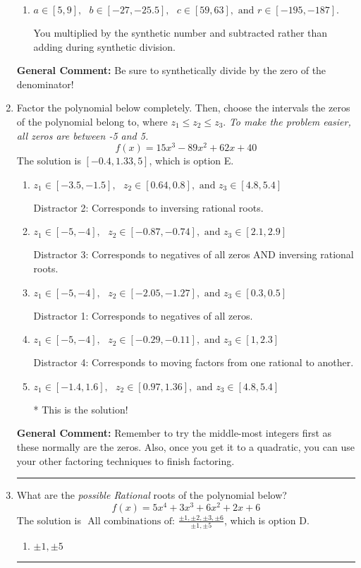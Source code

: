 \documentclass{extbook}[14pt]
\newcommand{\litem}[1]{\item #1

\rule{\textwidth}{0.4pt}}
\begin{document}
\begin{enumerate}
{\begin{enumerate}[label=\Alph*.]
 You divided by the opposite of the factor.
\item \( a \in [5, 9], \text{   } b \in [-27, -25.5], \text{   } c \in [59, 63], \text{   and   } r \in [-195, -187]. \)

 You multiplied by the synthetic number and subtracted rather than adding during synthetic division.
\end{enumerate}

\textbf{General Comment:} Be sure to synthetically divide by the zero of the denominator!
}
\litem{
Factor the polynomial below completely. Then, choose the intervals the zeros of the polynomial belong to, where $z_1 \leq z_2 \leq z_3$. \textit{To make the problem easier, all zeros are between -5 and 5.}
\[ f(x) = 15x^{3} -89 x^{2} +62 x + 40 \]The solution is \( [-0.4, 1.33, 5] \), which is option E.\begin{enumerate}[label=\Alph*.]
\item \( z_1 \in [-3.5, -1.5], \text{   }  z_2 \in [0.64, 0.8], \text{   and   } z_3 \in [4.8, 5.4] \)

 Distractor 2: Corresponds to inversing rational roots.
\item \( z_1 \in [-5, -4], \text{   }  z_2 \in [-0.87, -0.74], \text{   and   } z_3 \in [2.1, 2.9] \)

 Distractor 3: Corresponds to negatives of all zeros AND inversing rational roots.
\item \( z_1 \in [-5, -4], \text{   }  z_2 \in [-2.05, -1.27], \text{   and   } z_3 \in [0.3, 0.5] \)

 Distractor 1: Corresponds to negatives of all zeros.
\item \( z_1 \in [-5, -4], \text{   }  z_2 \in [-0.29, -0.11], \text{   and   } z_3 \in [1, 2.3] \)

 Distractor 4: Corresponds to moving factors from one rational to another.
\item \( z_1 \in [-1.4, 1.6], \text{   }  z_2 \in [0.97, 1.36], \text{   and   } z_3 \in [4.8, 5.4] \)

* This is the solution!
\end{enumerate}

\textbf{General Comment:} Remember to try the middle-most integers first as these normally are the zeros. Also, once you get it to a quadratic, you can use your other factoring techniques to finish factoring.
}
\litem{
What are the \textit{possible Rational} roots of the polynomial below?
\[ f(x) = 5x^{4} +3 x^{3} +6 x^{2} +2 x + 6 \]The solution is \( \text{ All combinations of: }\frac{\pm 1,\pm 2,\pm 3,\pm 6}{\pm 1,\pm 5} \), which is option D.\begin{enumerate}[label=\Alph*.]
\item \( \pm 1,\pm 5 \)


\end{enumerate}}
\end{enumerate}
\end{document}
